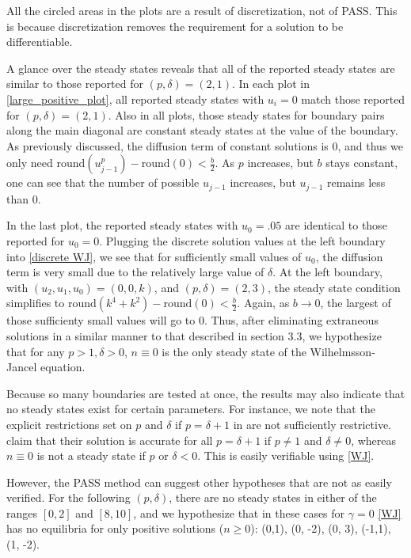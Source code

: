 \documentclass[11pt]{article}
\begin{document}
All the circled areas in the plots are a result of discretization, not of PASS. This is because discretization removes the requirement for a solution to be differentiable. 

A glance over the steady states reveals that all of the reported steady states are similar to those reported for $(p, \delta) = (2,1)$. In each plot in \cref{large_positive_plot}, all reported steady states with $u_i = 0$ match those reported for $(p, \delta) = (2,1)$. Also in all plots, those steady states for boundary pairs along the main diagonal are constant steady states at the value of the boundary. As previously discussed, the diffusion term of constant solutions is 0, and thus we only need $\text{round}(u_{j-1}^p) - \text{round}(0) < \frac{b}{2}$. As $p$ increases, but $b$ stays constant, one can see that the number of possible $u_{j-1}$ increases, but $u_{j-1}$ remains less than 0. 

In the last plot, the reported steady states with $u_0 = .05$ are identical to those reported for $u_0 = 0$. Plugging the discrete solution values at the left boundary into \cref{discrete WJ}, we see that for sufficiently small values of $u_0$, the diffusion term is very small due to the relatively large value of $\delta$. At the left boundary, with $(u_2, u_1, u_0) = (0,0,k)$, and $(p, \delta) = (2,3)$, the steady state condition simplifies to $\text{round}(k^4 + k^2) - \text{round}(0) < \frac{b}{2}$. Again, as $b \rightarrow 0$, the largest of those sufficienty small values will go to 0. Thus, after eliminating extraneous solutions in a similar manner to that described in section 3.3, we hypothesize that for any $p > 1, \delta > 0$, $n \equiv 0$ is the only steady state of the Wilhelmsson-Jancel equation.

Because so many boundaries are tested at once, the results may also indicate that no steady states exist for certain parameters. For instance, we note that the explicit restrictions set on $p$ and $\delta$ if $p = \delta + 1$ in \citep{WJ} are not sufficiently restrictive. \citep{WJ} claim that their solution is accurate for all $p = \delta + 1$ if $p \ne 1$ and $\delta \ne 0$, whereas $n \equiv 0$ is not a steady state if $p$ or $\delta < 0$. This is easily verifiable using \cref{WJ}. 

However, the PASS method can suggest other hypotheses that are not as easily verified. For the following $(p, \delta)$, there are no steady states in either of the ranges $[0,2]$ and $[8,10]$, and we hypothesize that in these cases for $\gamma = 0$ \cref{WJ} has no equilibria for only positive solutions ($n \ge 0$): (0,1), (0, -2), (0, 3), (-1,1), (1, -2).
\end{document}
